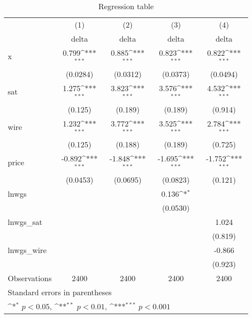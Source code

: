 \begin{table}[htbp]\centering
\def\sym#1{\ifmmode^{#1}\else\(^{#1}\)\fi}
\caption{Regression table\label{tab1}}
\begin{tabular}{l*{4}{c}}
\hline\hline
                    &\multicolumn{1}{c}{(1)}&\multicolumn{1}{c}{(2)}&\multicolumn{1}{c}{(3)}&\multicolumn{1}{c}{(4)}\\
                    &\multicolumn{1}{c}{delta}&\multicolumn{1}{c}{delta}&\multicolumn{1}{c}{delta}&\multicolumn{1}{c}{delta}\\
\hline
x                   &       0.799\sym{***}&       0.885\sym{***}&       0.823\sym{***}&       0.822\sym{***}\\
                    &    (0.0284)         &    (0.0312)         &    (0.0373)         &    (0.0494)         \\
[1em]
sat                 &       1.275\sym{***}&       3.823\sym{***}&       3.576\sym{***}&       4.532\sym{***}\\
                    &     (0.125)         &     (0.189)         &     (0.189)         &     (0.914)         \\
[1em]
wire                &       1.232\sym{***}&       3.772\sym{***}&       3.525\sym{***}&       2.784\sym{***}\\
                    &     (0.125)         &     (0.188)         &     (0.189)         &     (0.725)         \\
[1em]
price               &      -0.892\sym{***}&      -1.848\sym{***}&      -1.695\sym{***}&      -1.752\sym{***}\\
                    &    (0.0453)         &    (0.0695)         &    (0.0823)         &     (0.121)         \\
[1em]
lnwgs               &                     &                     &       0.136\sym{*}  &                     \\
                    &                     &                     &    (0.0530)         &                     \\
[1em]
lnwgs\_sat           &                     &                     &                     &       1.024         \\
                    &                     &                     &                     &     (0.819)         \\
[1em]
lnwgs\_wire          &                     &                     &                     &      -0.866         \\
                    &                     &                     &                     &     (0.923)         \\
\hline
Observations        &        2400         &        2400         &        2400         &        2400         \\
\hline\hline
\multicolumn{5}{l}{\footnotesize Standard errors in parentheses}\\
\multicolumn{5}{l}{\footnotesize \sym{*} \(p<0.05\), \sym{**} \(p<0.01\), \sym{***} \(p<0.001\)}\\
\end{tabular}
\end{table}
